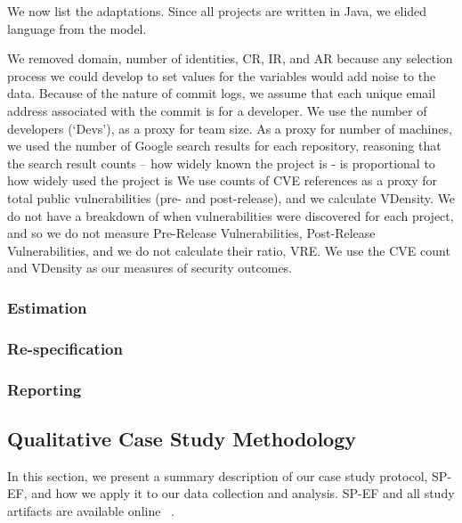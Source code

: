 We now list the adaptations. Since all projects are written in Java, we elided language from the model. 

We removed domain, number of identities, CR, IR, and AR because any selection process we could develop to set values for the variables would add noise to the data. Because of the nature of commit logs, we assume that each unique email address associated with the commit is for a developer. We use the number of developers (‘Devs’), as a proxy for team size. As a proxy for number of machines, we used the number of Google  search results for each repository, reasoning that the search result counts – how widely known the project is - is proportional to how widely used the project is We use counts of CVE references as a proxy for total public vulnerabilities (pre- and post-release), and we calculate VDensity. We do not have a breakdown of when vulnerabilities were discovered for each project, and so we do not measure Pre-Release Vulnerabilities, Post-Release Vulnerabilities, and we do not calculate their ratio, VRE. We use the CVE count and VDensity as our measures of security outcomes. 



\subsubsection{Estimation}
\subsubsection{Re-specification}
\subsubsection{Reporting}


\subsection{Qualitative Case Study Methodology}
In this section, we present a summary description of our case study protocol, SP-EF, and how we apply it to our data collection and analysis. SP-EF and all study artifacts are available online ~\cite{morrison2016spef}. 

